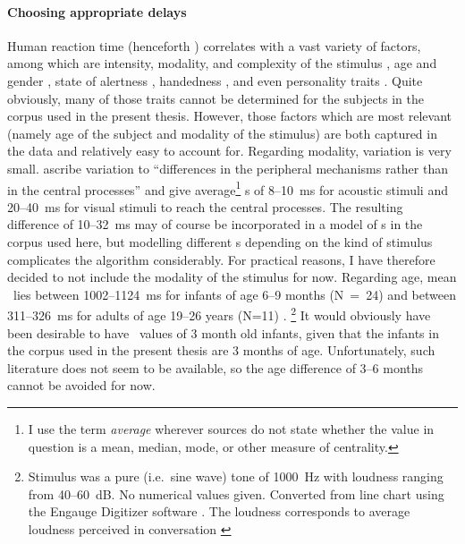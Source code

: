 \paragraph{Choosing appropriate delays}  %
Human reaction time (henceforth \rt) correlates with a vast variety of factors, among which are intensity, modality, and complexity of the stimulus \citep{brebner_introduction:_1980}, age and gender \citep{der_age_2006}, state of alertness \citep{appelle_simple_1974}, handedness \citep{dane_sex_2003}, and even personality traits \citep{stelmack_personality_1993}.
Quite obviously, many of those traits cannot be determined for the subjects in the corpus used in the present thesis.
However, those factors which are most relevant (namely age of the subject and modality of the stimulus) are both captured in the data and relatively easy to account for.
Regarding modality, variation is very small.
\citet[]{brebner_introduction:_1980} ascribe variation to ``differences in the peripheral mechanisms rather than in the central processes'' and give average\footnote{I use the term \emph{average} wherever sources do not state whether the value in question is a mean, median, mode, or other measure of centrality.} \rt s of 8--10~ms for acoustic stimuli and 20--40~ms for visual stimuli to reach the central processes.
The resulting difference of 10--32~ms may of course be incorporated in a model of \rt s in the corpus used here, but modelling different \rt s depending on the kind of stimulus complicates the algorithm considerably.
For practical reasons, I have therefore decided to not include the modality of the stimulus for now.
Regarding age, mean \rt\ lies  between 1002--1124~ms for infants of age 6--9 months (N~=~24) and between 311--326~ms for adults of age 19--26 years (N=11) \citep[]{leibold_relationship_2002}.%
\footnote{Stimulus was a pure (i.e.~sine wave) tone of 1000~Hz with loudness ranging from 40--60~dB.
No numerical values given.
Converted from line chart using the Engauge Digitizer software \citep{mitchell_engauge_2002}.
The loudness corresponds to average loudness perceived in conversation \citep[]{gorne_tontechnik_2006}} It would obviously have been desirable to have \rt\ values of 3 month old infants, given that the infants in the  corpus used in the present thesis are 3 months of age.
Unfortunately, such literature does not seem to be available, so the age difference of 3--6 months cannot be avoided for now.
